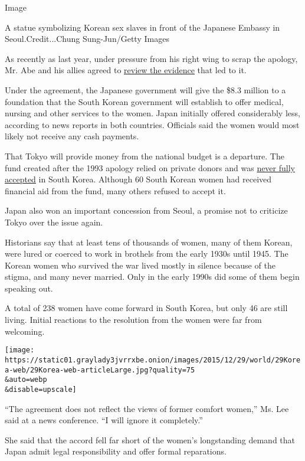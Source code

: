 Image

A statue symbolizing Korean sex slaves in front of the Japanese Embassy
in Seoul.Credit...Chung Sung-Jun/Getty Images

As recently as last year, under pressure from his right wing to scrap
the apology, Mr. Abe and his allies agreed to
\href{http://www.nytimes3xbfgragh.onion/2014/03/01/world/asia/japan-to-review-apology-made-to-wwii-comfort-women.html}{review
the evidence} that led to it.

Under the agreement, the Japanese government will give the \$8.3 million
to a foundation that the South Korean government will establish to offer
medical, nursing and other services to the women. Japan initially
offered considerably less, according to news reports in both countries.
Officials said the women would most likely not receive any cash
payments.

That Tokyo will provide money from the national budget is a departure.
The fund created after the 1993 apology relied on private donors and was
\href{http://www.nytimes3xbfgragh.onion/2007/04/25/world/asia/25japan.html}{never
fully accepted} in South Korea. Although 60 South Korean women had
received financial aid from the fund, many others refused to accept it.

Japan also won an important concession from Seoul, a promise not to
criticize Tokyo over the issue again.

Historians say that at least tens of thousands of women, many of them
Korean, were lured or coerced to work in brothels from the early 1930s
until 1945. The Korean women who survived the war lived mostly in
silence because of the stigma, and many never married. Only in the early
1990s did some of them begin speaking out.

A total of 238 women have come forward in South Korea, but only 46 are
still living. Initial reactions to the resolution from the women were
far from welcoming.

\texttt{[image: https://static01.graylady3jvrrxbe.onion/images/2015/12/29/world/29Korea-web/29Korea-web-articleLarge.jpg?quality=75\\\&auto=webp\\\&disable=upscale]}

``The agreement does not reflect the views of former comfort women,''
Ms. Lee said at a news conference. ``I will ignore it completely.''

She said that the accord fell far short of the women's longstanding
demand that Japan admit legal responsibility and offer formal
reparations.

